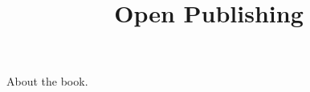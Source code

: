 \documentclass{article}
\begin{document}
\title{Open Publishing}

\maketitle


About the book.
\end{document}
